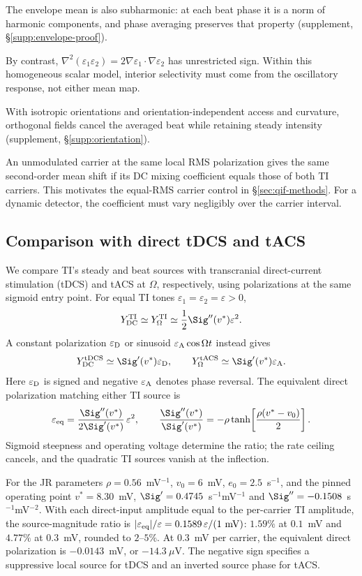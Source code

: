 The envelope mean is also subharmonic: at each beat phase it is a norm of
harmonic components, and phase averaging preserves that property (supplement,
\S\ref{supp:envelope-proof}).
\ifjne\else

\fi
By contrast,
$\nabla^2(\varepsilon_1\varepsilon_2)=2\nabla\varepsilon_1\cdot\nabla\varepsilon_2$
has unrestricted sign. Within this homogeneous scalar model, interior
selectivity must come from the oscillatory response, not either mean map.

With isotropic orientations and orientation-independent access and curvature,
orthogonal fields cancel the averaged beat while retaining steady intensity
(supplement, \S\ref{supp:orientation}).
\ifjne\else

\fi

An unmodulated carrier at the same local RMS polarization gives the same
second-order mean shift if its DC mixing coefficient equals those of both
TI carriers. This motivates the equal-RMS carrier control in
\S\ref{sec:qif-methods}. For a dynamic detector, the coefficient must vary
negligibly over the carrier interval.

\subsection{Comparison with direct tDCS and tACS}\label{sec:direct-comparison}
We compare TI's steady and beat sources with transcranial direct-current
stimulation (tDCS) and tACS at $\Omega$, respectively, using polarizations
at the same sigmoid entry point. For equal TI tones
$\varepsilon_1=\varepsilon_2=\varepsilon>0$,
\[
Y_{\rm DC}^{\rm TI}\simeq Y_\Omega^{\rm TI}
\simeq \frac12\Sig''(v^*)\varepsilon^2.
\]
A constant polarization $\varepsilon_{\rm D}$ or sinusoid
$\varepsilon_{\rm A}\cos\Omega t$ instead gives
\[
Y_{\rm DC}^{\rm tDCS}\simeq\Sig'(v^*)\varepsilon_{\rm D},
\qquad
Y_\Omega^{\rm tACS}\simeq\Sig'(v^*)\varepsilon_{\rm A}.
\]
Here $\varepsilon_{\rm D}$ is signed and negative $\varepsilon_{\rm A}$
denotes phase reversal. The equivalent direct polarization matching either
TI source is
\[
\varepsilon_{\rm eq}
=\frac{\Sig''(v^*)}{2\Sig'(v^*)}\,\varepsilon^2,
\qquad
\frac{\Sig''(v^*)}{\Sig'(v^*)}
=-\rho\tanh\!\left[\frac{\rho(v^*-v_0)}2\right].
\]
Sigmoid steepness and operating voltage determine the ratio; the rate ceiling
cancels, and the quadratic TI sources vanish at the inflection.

For the JR parameters $\rho=0.56$~mV$^{-1}$, $v_0=6$~mV,
$e_0=2.5$~s$^{-1}$, and the pinned operating point $v^*=8.30$~mV,
$\Sig'=0.4745$~s$^{-1}$mV$^{-1}$ and
$\Sig''=-0.1508$~s$^{-1}$mV$^{-2}$. With each direct-input amplitude
equal to the per-carrier TI amplitude, the source-magnitude ratio is
$|\varepsilon_{\rm eq}|/\varepsilon
=0.1589\,\varepsilon/(1~\mathrm{mV})$:
$1.59\%$ at $0.1$~mV and $4.77\%$ at $0.3$~mV, rounded to $2$--$5\%$.
At $0.3$~mV per carrier, the equivalent direct polarization is
$-0.0143$~mV, or $-14.3~\mu$V. The negative sign specifies a suppressive
local source for tDCS and an inverted source phase for tACS.

